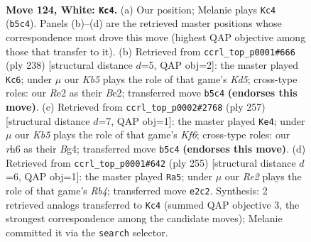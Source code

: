 \documentclass[11pt]{article}
\begin{document}
\clearpage

\begin{figure}[p]\centering
\begin{subfigure}{0.46\textwidth}\centering
\resizebox{\linewidth}{!}{%
\newchessgame
\chessboard[
  setfen={6k1/8/7r/1K6/1B6/8/4R3/8 w - - 15 124},
  showmover=false,
  pgfstyle=straightmove, color=movearrow, markmove={b5-c4}
]}
\caption{}
\end{subfigure}\hfill
\begin{subfigure}{0.46\textwidth}\centering
\resizebox{\linewidth}{!}{%
\newchessgame
\chessboard[
  setfen={8/8/3B4/k2K4/8/8/4B3/8 w - - 17 120},
  showmover=false,
  pgfstyle=straightmove, color=movearrow, markmove={d5-c6}
]}
\caption{}
\end{subfigure}
\\[4pt]
\begin{subfigure}{0.46\textwidth}\centering
\resizebox{\linewidth}{!}{%
\newchessgame
\chessboard[
  setfen={7R/8/8/8/6b1/5k2/8/4K3 b - - 2 129},
  showmover=false,
  pgfstyle=straightmove, color=movearrow, markmove={f3-e4}
]}
\caption{}
\end{subfigure}\hfill
\begin{subfigure}{0.46\textwidth}\centering
\resizebox{\linewidth}{!}{%
\newchessgame
\chessboard[
  setfen={2R5/6k1/8/1r6/8/4K3/8/8 b - - 1 128},
  showmover=false,
  pgfstyle=straightmove, color=movearrow, markmove={b5-a5}
]}
\caption{}
\end{subfigure}
\caption{\textbf{Move 124, White: \texttt{Kc4}.} (a) Our position; Melanie plays \texttt{Kc4} (\texttt{b5c4}). Panels (b)--(d) are the retrieved master positions whose correspondence most drove this move (highest QAP objective among those that transfer to it). (b) Retrieved from \texttt{ccrl\_top\_p0001\#666} (ply 238) [structural distance $d$=5, QAP obj=2]: the master played \texttt{Kc6}; under $\mu$ our \emph{Kb5} plays the role of that game's \emph{Kd5}; cross-type roles: our \emph{R}e2 as their \emph{B}e2; transferred move \texttt{b5c4} \textbf{(endorses this move)}. (c) Retrieved from \texttt{ccrl\_top\_p0002\#2768} (ply 257) [structural distance $d$=7, QAP obj=1]: the master played \texttt{Ke4}; under $\mu$ our \emph{Kb5} plays the role of that game's \emph{Kf6}; cross-type roles: our \emph{r}h6 as their \emph{B}g4; transferred move \texttt{b5c4} \textbf{(endorses this move)}. (d) Retrieved from \texttt{ccrl\_top\_p0001\#642} (ply 255) [structural distance $d$=6, QAP obj=1]: the master played \texttt{Ra5}; under $\mu$ our \emph{Re2} plays the role of that game's \emph{Rb4}; transferred move \texttt{e2c2}. Synthesis: 2 retrieved analogs transferred to \texttt{Kc4} (summed QAP objective 3, the strongest correspondence among the candidate moves); Melanie committed it via the \texttt{search} selector.}
\label{fig:thought-m246}
\end{figure}
\end{document}
